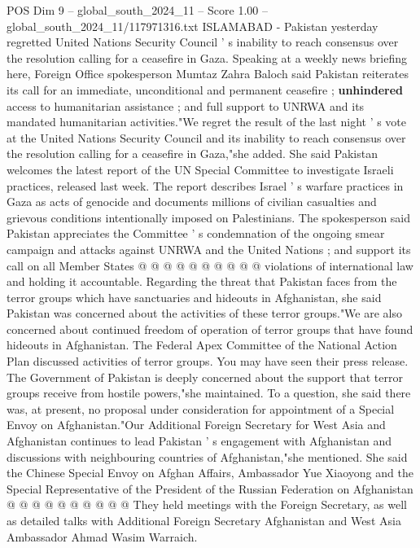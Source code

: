 \begin{textsample}{POS Dim 9 – global\_south\_2024\_11 – Score 1.00 – global\_south\_2024\_11/117971316.txt}  \label{ex:f9_pos_145}
ISLAMABAD - Pakistan yesterday regretted United Nations Security Council ' s inability to reach consensus over the resolution calling for a ceasefire in Gaza.
Speaking at a weekly news briefing here, Foreign Office spokesperson Mumtaz Zahra Baloch said Pakistan reiterates its call for an immediate, unconditional and permanent ceasefire ; \textbf{unhindered} access to humanitarian assistance ; and full support to UNRWA and its mandated humanitarian activities."We regret the result of the last night ' s vote at the United Nations Security Council and its inability to reach consensus over the resolution calling for a ceasefire in Gaza,"she added.
She said Pakistan welcomes the latest report of the UN Special Committee to investigate Israeli practices, released last week.
The report describes Israel ' s warfare practices in Gaza as acts of genocide and documents millions of civilian casualties and grievous conditions intentionally imposed on Palestinians.
The spokesperson said Pakistan appreciates the Committee ' s condemnation of the ongoing smear campaign and attacks against UNRWA and the United Nations ; and support its call on all Member States @ @ @ @ @ @ @ @ @ @ violations of international law and holding it accountable.
Regarding the threat that Pakistan faces from the terror groups which have sanctuaries and hideouts in Afghanistan, she said Pakistan was concerned about the activities of these terror groups."We are also concerned about continued freedom of operation of terror groups that have found hideouts in Afghanistan.
The Federal Apex Committee of the National Action Plan discussed activities of terror groups.
You may have seen their press release.
The Government of Pakistan is deeply concerned about the support that terror groups receive from hostile powers,"she maintained.
To a question, she said there was, at present, no proposal under consideration for appointment of a Special Envoy on Afghanistan."Our Additional Foreign Secretary for West Asia and Afghanistan continues to lead Pakistan ' s engagement with Afghanistan and discussions with neighbouring countries of Afghanistan,"she mentioned.
She said the Chinese Special Envoy on Afghan Affairs, Ambassador Yue Xiaoyong and the Special Representative of the President of the Russian Federation on Afghanistan @ @ @ @ @ @ @ @ @ @ They held meetings with the Foreign Secretary, as well as detailed talks with Additional Foreign Secretary Afghanistan and West Asia Ambassador Ahmad Wasim Warraich.

\end{textsample}
